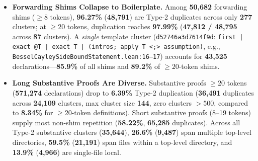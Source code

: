 \documentclass[10pt,twocolumn]{article}
\begin{document}
\begin{itemize}\setlength{\itemsep}{1pt}\setlength{\parskip}{0pt}\setlength{\topsep}{2pt}
  \item \textbf{Forwarding Shims Collapse to Boilerplate.} Among \textbf{50,682} forwarding shims ($\ge 8$ tokens), \textbf{96.27\%} (\textbf{48,791}) are Type-2 duplicates across only \textbf{277} clusters; at $\ge 20$ tokens, duplication reaches \textbf{97.99\%} (\textbf{47,812 / 48,795} across \textbf{87} clusters). A \emph{single} template cluster (\texttt{d52746a3d7614f9d}: \texttt{first | exact @T | exact T | (intros; apply T <;> assumption)}, e.g., \texttt{BesselCayleySideBoundStatement.lean:16--17}) accounts for \textbf{43,525} declarations---\textbf{85.9\%} of all shims and \textbf{89.2\%} of $\ge 20$-token shims.
  \item \textbf{Long Substantive Proofs Are Diverse.} Substantive proofs $\ge 20$ tokens (\textbf{571,274} declarations) drop to \textbf{6.39\%} Type-2 duplication (\textbf{36,491} duplicates across \textbf{24,109} clusters, max cluster size \textbf{144}, zero clusters $>500$, compared to \textbf{8.34\%} for $\ge 20$-token definitions). Short substantive proofs (8--19 tokens) supply most non-shim repetition (\textbf{58.22\%}, \textbf{65,285} duplicates). Across all Type-2 substantive clusters (\textbf{35,644}), \textbf{26.6\%} (\textbf{9,487}) span multiple top-level directories, \textbf{59.5\%} (\textbf{21,191}) span files within a top-level directory, and \textbf{13.9\%} (\textbf{4,966}) are single-file local.
\end{itemize}

\begin{table}[t]
\centering
\caption{Clone Decomposition ($\ge 8$ Tokens; Zero Cross-Bucket Overlap)}
\label{tab:clones}
\footnotesize
\setlength{\tabcolsep}{3.0pt}
\end{table}
\end{document}
